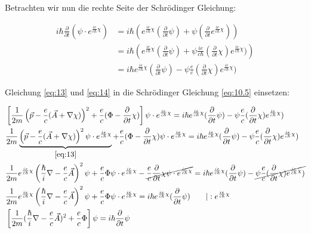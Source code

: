 Betrachten wir nun die rechte Seite der Schrödinger Gleichung:

\begin{align}
i\hbar \frac{\partial}{\partial t}(\psi \cdot e^{\frac{ie}{c\hbar}\chi}) &=  i\hbar\left(  e^{\frac{ie}{c\hbar}\chi} ( \frac{\partial}{\partial t}\psi ) +\psi (\frac{\partial}{\partial t} e^{\frac{ie}{c\hbar}\chi}) \right)\\
 &=  i\hbar\left(  e^{\frac{ie}{c\hbar}\chi} ( \frac{\partial}{\partial t}\psi ) +\psi \frac{ie}{c\hbar}( \frac{\partial}{\partial t}  \chi)  e^{\frac{ie}{c\hbar}\chi}) \right)\\
 &=  i\hbar   e^{\frac{ie}{c\hbar}\chi} ( \frac{\partial}{\partial t}\psi ) -\psi \frac{e}{c}( \frac{\partial}{\partial t}  \chi)  e^{\frac{ie}{c\hbar}\chi})   \label{eq:14}
 \end{align}


Gleichung \eqref{eq:13} und \eqref{eq:14} in die Schrödinger Gleichung \eqref{eq:10.5} einsetzen:

\begin{align}
  &\left[\frac{1}{2m} \left(\vec p - \frac{e}{c}(\vec A +\nabla\chi) \right)^2  + \frac{e}{c}(\Phi-  \frac{\partial}{\partial t} \chi) \right]\psi\cdot e^{\frac{ie}{c\hbar}\chi}  =   i\hbar   e^{\frac{ie}{c\hbar}\chi} ( \frac{\partial}{\partial t}\psi ) -\psi \frac{e}{c}( \frac{\partial}{\partial t}  \chi)  e^{\frac{ie}{c\hbar}\chi})\\
&\frac{1}{2m} \underbrace{\left(\vec p - \frac{e}{c}(\vec A +\nabla\chi) \right)^2\psi\cdot e^{\frac{ie}{c\hbar}\chi} }_{\eqref{eq:13}} + \frac{e}{c}(\Phi-  \frac{\partial}{\partial t} \chi) \psi\cdot e^{\frac{ie}{c\hbar}\chi}  =   i\hbar   e^{\frac{ie}{c\hbar}\chi} ( \frac{\partial}{\partial t}\psi ) -\psi \frac{e}{c}( \frac{\partial}{\partial t}  \chi)  e^{\frac{ie}{c\hbar}\chi})\\
&\frac{1}{2m}e^{\frac{ie}{c\hbar}\chi}\left( \frac{\hbar}{i}\nabla- \frac{e}{c}\vec A \right)^2\psi  + \frac{e}{c}\Phi\psi\cdot e^{\frac{ie}{c\hbar}\chi} - \cancel{\frac{e}{c} \frac{\partial}{\partial t} \chi \psi\cdot e^{\frac{ie}{c\hbar}\chi}}  =   i\hbar   e^{\frac{ie}{c\hbar}\chi} ( \frac{\partial}{\partial t}\psi ) - \cancel{ \psi \frac{e}{c}( \frac{\partial}{\partial t}  \chi)  e^{\frac{ie}{c\hbar}\chi})}\\
&\frac{1}{2m}e^{\frac{ie}{c\hbar}\chi}\left( \frac{\hbar}{i}\nabla- \frac{e}{c}\vec A \right)^2\psi  + \frac{e}{c}\Phi\psi\cdot e^{\frac{ie}{c\hbar}\chi} =   i\hbar   e^{\frac{ie}{c\hbar}\chi} ( \frac{\partial}{\partial t}\psi )   \qquad |:e^{\frac{ie}{c\hbar}\chi}\\
&\left[\frac{1}{2m} (\frac{\hbar}{i}\nabla - \frac{e}{c}\vec A)^2  +  \frac{e}{c} \Phi \right]\psi =  i\hbar \frac{\partial}{\partial t}\psi 
\end{align}

